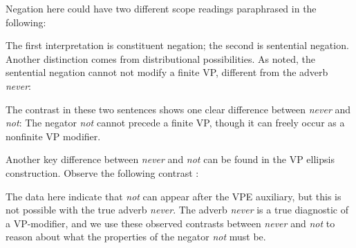 \documentclass[output=paper
                ,modfonts
                ,nonflat
	        ,collection
	        ,collectionchapter
	        ,collectiontoclongg
 	        ,biblatex
                ,babelshorthands
                ,newtxmath
                ,draftmode
                ,colorlinks, citecolor=brown
]{./langsci/langscibook}
\begin{document}
{\begin{exe}
\begin{xlist}
\begin{exe}
\begin{xlist}
\z
%
Negation here could have two different scope readings
paraphrased in the following:


\eal
{}
\zl
%
The first interpretation is constituent negation; the second is
sentential negation. Another distinction comes from
distributional possibilities. As noted, the sentential
negation  cannot not modify a finite
VP, different from the adverb \textit{never}:

\eal
{}
\zl
%
The contrast in these two sentences
shows one clear difference between \textit{never}
and \textit{not}:  The negator \textit{not} cannot
precede a finite VP, though it can freely occur
as a nonfinite VP modifier.

%
%
%
%

Another key difference between \textit{never} and \textit{not} can be found in
the VP ellipsis construction.  Observe the following
contrast \citep{KS:02}:

\eal
\label{negation-vpe-not-ex}
\zl
%
\noindent The data here indicate that \textit{not} can appear
after the VPE auxiliary, but this is not possible with
the true adverb \emph{never}.
The adverb \textit{never} is a true
diagnostic of a VP-modifier, and we use
these observed contrasts
between \textit{never} and \textit{not} to reason about what the properties of the negator \textit{not} must be.
%
%


\end{xlist}
\end{exe}
\end{xlist}
\end{exe}}
\end{document}
